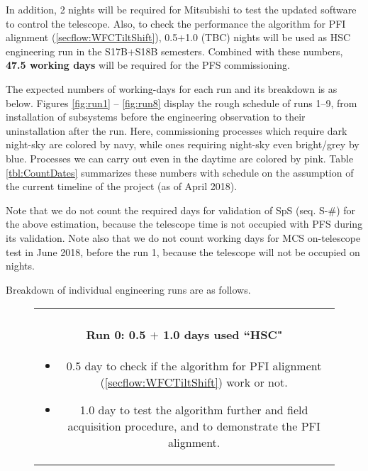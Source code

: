 In addition, 2 nights will be required for Mitsubishi to test the updated software to control the telescope.
Also, to check the performance the algorithm for PFI alignment (\ref{secflow:WFCTiltShift}), 0.5$+$1.0 (TBC) nights will be used as HSC engineering run in the S17B$+$S18B semesters.
Combined with these numbers, {\bf 47.5 working days} will be required for the PFS commissioning.

The expected numbers of working-days for each run and its breakdown is as below.
Figures \ref{fig:run1} -- \ref{fig:run8}  display the rough schedule of runs 1--9, from installation of subsystems before the engineering observation to their uninstallation after the run.
Here, commissioning processes which require dark night-sky are colored by navy, while ones requiring night-sky even bright/grey by blue.
Processes we can carry out even in the daytime are colored by pink.
Table \ref{tbl:CountDates} summarizes these numbers with schedule on the assumption of the current timeline of the project (as of April 2018).

Note that we do not count the required days for validation of SpS (seq. S-\#) for the above estimation, because the telescope time is not occupied with PFS during its validation.
Note also that we do not count working days for MCS on-telescope test in June 2018, before the run 1, because the telescope will not be occupied on nights. 

\bigskip

Breakdown of individual engineering runs are as follows.

\begin{figure}[!ht]
\begin{center}
\begin{tabular}{c}
\begin{minipage}{0.95\hsize}
\paragraph{Run 0: 0.5 $+$ 1.0 days used ``HSC"}
	\begin{itemize}
	\item 0.5 day to check if the algorithm for PFI alignment (\ref{secflow:WFCTiltShift}) work or not.
	\item 1.0 day to test the algorithm further and field acquisition procedure, and to demonstrate the PFI alignment.
	\end{itemize}
\end{minipage}
\end{tabular}
\end{center}
\end{figure}

